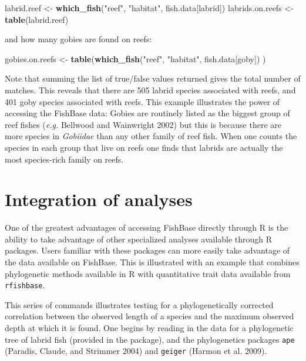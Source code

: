 \documentclass[author-year]{elsarticle} %
\newenvironment{Shaded}{}{}
\newcommand{\KeywordTok}[1]{\textcolor[rgb]{0.00,0.44,0.13}{\textbf{{#1}}}}
\newcommand{\StringTok}[1]{\textcolor[rgb]{0.25,0.44,0.63}{{#1}}}
\newcommand{\NormalTok}[1]{{#1}}
\begin{document}
\begin{Shaded}
\begin{Highlighting}[]
\NormalTok{labrid.reef <- }\KeywordTok{which_fish}\NormalTok{(}\StringTok{"reef"}\NormalTok{, }\StringTok{"habitat"}\NormalTok{, fish.data[labrid])}
\NormalTok{labrids.on.reefs <- }\KeywordTok{table}\NormalTok{(labrid.reef)}
\end{Highlighting}
\end{Shaded}
and how many gobies are found on reefs:

\begin{Shaded}
\begin{Highlighting}[]
\NormalTok{gobies.on.reefs <- }\KeywordTok{table}\NormalTok{(}\KeywordTok{which_fish}\NormalTok{(}\StringTok{"reef"}\NormalTok{, }\StringTok{"habitat"}\NormalTok{, fish.data[goby]) )}
\end{Highlighting}
\end{Shaded}
Note that summing the list of true/false values returned gives the total
number of matches. This reveals that there are 505 labrid species
associated with reefs, and 401 goby species associated with reefs. This
example illustrates the power of accessing the FishBase data: Gobies are
routinely listed as the biggest group of reef fishes (\emph{e.g.}
Bellwood and Wainwright 2002) but this is because there are more species
in \emph{Gobiidae} than any other family of reef fish. When one counts
the species in each group that live on reefs one finds that labrids are
actually the most species-rich family on reefs.

\section{Integration of analyses}

One of the greatest advantages of accessing FishBase directly through R
is the ability to take advantage of other specialized analyses available
through R packages. Users familiar with these packages can more easily
take advantage of the data available on FishBase. This is illustrated
with an example that combines phylogenetic methods available in R with
quantitative trait data available from \texttt{rfishbase}.

This series of commands illustrates testing for a phylogenetically
corrected correlation between the observed length of a species and the
maximum observed depth at which it is found. One begins by reading in
the data for a phylogenetic tree of labrid fish (provided in the
package), and the phylogenetics packages \texttt{ape} (Paradis, Claude,
and Strimmer 2004) and \texttt{geiger} (Harmon et al. 2009).
\end{document}
